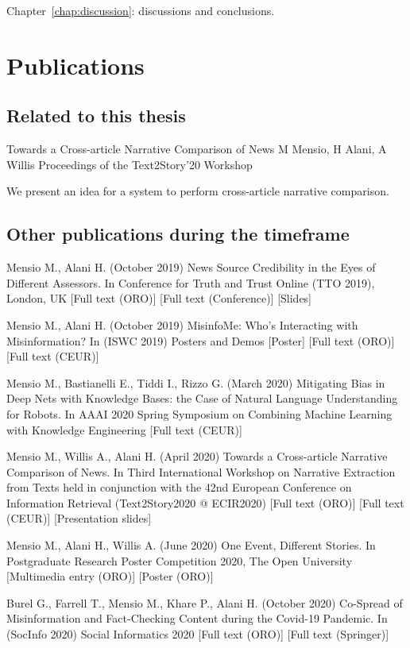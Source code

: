 Chapter~\ref{chap:discussion}: discussions and conclusions.

\section{\statusorange Publications}
\label{sec:intro_publications}

\subsection{Related to this thesis}

Towards a Cross-article Narrative Comparison of News
M Mensio, H Alani, A Willis
Proceedings of the Text2Story’20 Workshop

We present an idea for a system to perform cross-article narrative comparison.

\subsection{Other publications during the timeframe}

Mensio M., Alani H. (October 2019) News Source Credibility in the Eyes of Different Assessors. In Conference for Truth and Trust Online (TTO 2019), London, UK [Full text (ORO)] [Full text (Conference)] [Slides]

Mensio M., Alani H. (October 2019) MisinfoMe: Who’s Interacting with Misinformation? In (ISWC 2019) Posters and Demos [Poster] [Full text (ORO)] [Full text (CEUR)]


Mensio M., Bastianelli E., Tiddi I., Rizzo G. (March 2020) Mitigating Bias in Deep Nets with Knowledge Bases: the Case of Natural Language Understanding for Robots. In AAAI 2020 Spring Symposium on Combining Machine Learning with Knowledge Engineering [Full text (CEUR)]

Mensio M., Willis A., Alani H. (April 2020) Towards a Cross-article Narrative Comparison of News. In Third International Workshop on Narrative Extraction from Texts held in conjunction with the 42nd European Conference on Information Retrieval (Text2Story2020 @ ECIR2020) [Full text (ORO)] [Full text (CEUR)] [Presentation slides]

Mensio M., Alani H., Willis A. (June 2020) One Event, Different Stories. In Postgraduate Research Poster Competition 2020, The Open University [Multimedia entry (ORO)] [Poster (ORO)]

Burel G., Farrell T., Mensio M., Khare P., Alani H. (October 2020) Co-Spread of Misinformation and Fact-Checking Content during the Covid-19 Pandemic. In (SocInfo 2020) Social Informatics 2020 [Full text (ORO)] [Full text (Springer)]

